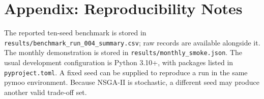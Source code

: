 \documentclass[12pt,a4paper]{report}
\begin{document}
\appendix
\chapter{Appendix: Reproducibility Notes}
The reported ten-seed benchmark is stored in \texttt{results/benchmark\_run\_004\_summary.csv}; raw records are available alongside it. The monthly demonstration is stored in \texttt{results/monthly\_smoke.json}. The usual development configuration is Python 3.10+, with packages listed in \texttt{pyproject.toml}. A fixed seed can be supplied to reproduce a run in the same pymoo environment. Because NSGA-II is stochastic, a different seed may produce another valid trade-off set.
\end{document}
